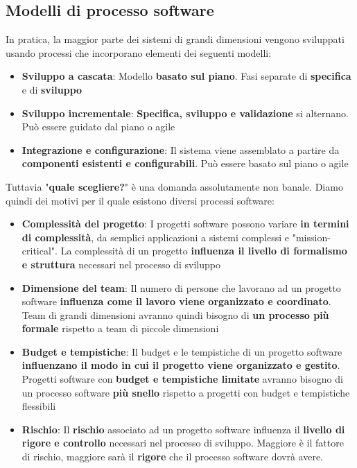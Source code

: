 \documentclass[12pt]{article}
\begin{document}
\subsection{Modelli di processo software}
In pratica, la maggior parte dei sistemi di grandi dimensioni vengono sviluppati usando processi che incorporano elementi dei seguenti modelli:
\begin{itemize}
    \item \textbf{Sviluppo a cascata}: Modello \textbf{basato sul piano}. Fasi separate di \textbf{specifica} e di \textbf{sviluppo}
    \item \textbf{Sviluppo incrementale}: \textbf{Specifica, sviluppo e validazione} si alternano. Può essere guidato dal piano o agile
    \item \textbf{Integrazione e configurazione}: Il sistema viene assemblato a partire da \textbf{componenti esistenti e configurabili}. Può essere basato sul piano o agile
\end{itemize} 
Tuttavia "\textbf{quale scegliere?}" è una domanda assolutamente non banale. Diamo quindi dei motivi per il quale esistono diversi processi software:
\begin{itemize}
    \item \textbf{Complessità del progetto}: I progetti software possono variare \textbf{in termini di complessità}, da semplici applicazioni a sistemi complessi e "mission-critical".
    La complessità di un progetto \textbf{influenza il livello di formalismo e struttura} necessari nel processo di sviluppo
    \item \textbf{Dimensione del team}: Il numero di persone che lavorano ad un progetto software \textbf{influenza come il lavoro viene organizzato e coordinato}.
    Team di grandi dimensioni avranno quindi bisogno di \textbf{un processo più formale} rispetto a team di piccole dimensioni
    \item \textbf{Budget e tempistiche}:  Il budget e le tempistiche di un progetto software \textbf{influenzano il modo in cui il progetto viene organizzato e gestito}.
    Progetti software con \textbf{budget e tempistiche limitate} avranno bisogno di un processo software \textbf{più snello} rispetto a progetti con budget e tempistiche flessibili
    \item \textbf{Rischio}: Il \textbf{rischio} associato ad un progetto software influenza il \textbf{livello di rigore e controllo} necessari nel processo di sviluppo.
    Maggiore è il fattore di rischio, maggiore sarà il \textbf{rigore} che il processo software dovrà avere.
\end{itemize}
\end{document}
